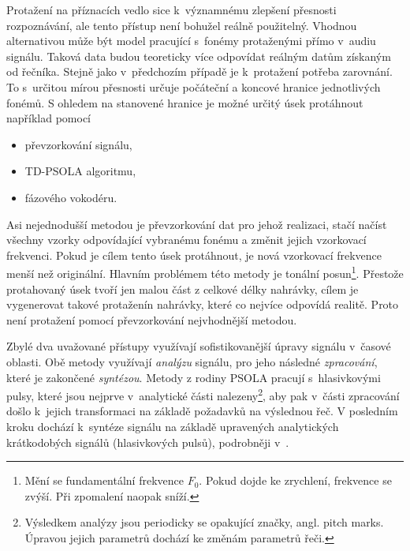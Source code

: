 Protažení na příznacích vedlo sice  k~významnému zlepšení přesnosti rozpoznávání, ale tento přístup není bohužel reálně použitelný. Vhodnou alternativou může být model pracující s~fonémy protaženými přímo v~audiu signálu.
Taková data budou teoreticky více odpovídat reálným datům získaným od řečníka.
Stejně jako v~předchozím případě je  k~protažení potřeba zarovnání.
To s~určitou mírou přesnosti určuje počáteční a koncové hranice jednotlivých fonémů.
S ohledem na stanovené hranice je možné určitý úsek protáhnout například pomocí

\begin{itemize}
  \item převzorkování signálu,
  \item TD-PSOLA algoritmu,
  \item fázového vokodéru.
\end{itemize}

\noindent Asi nejednodušší metodou je převzorkování dat pro jehož realizaci, stačí načíst všechny vzorky odpovídající vybranému fonému a změnit jejich vzorkovací frekvenci.
Pokud je cílem tento úsek protáhnout, je nová vzorkovací frekvence menší než originální. Hlavním problémem této metody je tonální posun\footnote{Mění se fundamentální frekvence $F_0$. Pokud dojde ke zrychlení, frekvence se zvýší. Při zpomalení naopak sníží.}.
Přestože protahovaný úsek tvoří jen malou část z celkové délky nahrávky, cílem je vygenerovat takové protaženín nahrávky, které co nejvíce odpovídá realitě.
Proto není protažení pomocí převzorkování nejvhodnější metodou.

Zbylé dva uvažované přístupy využívají sofistikovanější úpravy signálu v~časové oblasti.
Obě metody využívají \textit{analýzu} signálu, pro jeho následné \textit{zpracování}, které je zakončené \textit{syntézou}.
Metody z rodiny PSOLA pracují s~hlasivkovými pulsy, které jsou nejprve v~analytické části nalezeny\footnote{Výsledkem analýzy jsou periodicky se opakující značky, angl. pitch marks. Úpravou jejich parametrů dochází ke změnám parametrů řeči.}, aby pak v~části zpracování došlo  k~jejich transformaci na základě požadavků na výslednou řeč.
V posledním kroku dochází k~syntéze signálu na základě upravených analytických krátkodobých signálů (hlasivkových pulsů), podrobněji v~\cite{Psutka2006}.

